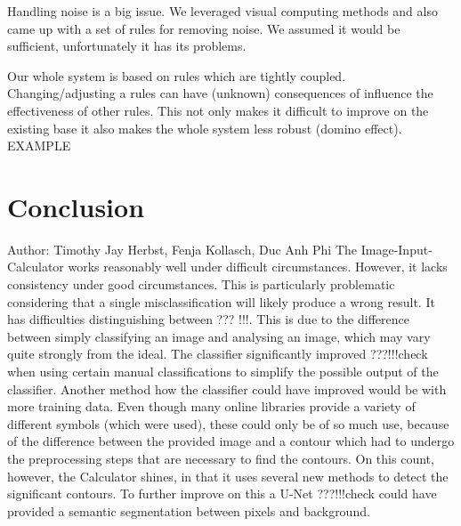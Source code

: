 \documentclass[12pt]{article}
\begin{document}
	Handling noise is a big issue. We leveraged visual computing methods and also came up with a set of rules for removing noise. We assumed it would be sufficient, unfortunately it has its problems.
	
	Our whole system is based on rules which are tightly coupled. Changing/adjusting a rules can have (unknown) consequences of influence the effectiveness of other rules. This not only makes it difficult to improve on the existing base it also makes the whole system less robust (domino effect). EXAMPLE
	
	
	\section{Conclusion}
		\small{Author: Timothy Jay Herbst, Fenja Kollasch, Duc Anh Phi} \newline \newline
	The Image-Input-Calculator works reasonably well under difficult circumstances.
	However, it lacks consistency under good circumstances.
	This is particularly problematic considering that a single misclassification will likely produce a wrong result.
	It has difficulties distinguishing between ??? !!!.
	This is due to the difference between simply classifying an image and analysing an image, which may vary quite strongly from the ideal.
	The classifier significantly improved ???!!!check when using certain manual classifications to simplify the possible output of the classifier.
	Another method how the classifier could have improved would be with more training data.
	Even though many online libraries provide a variety of different symbols (which were used), these could only be of so much use, because of the difference between the provided image and a contour which had to undergo the preprocessing steps that are necessary to find the contours.
	On this count, however, the Calculator shines, in that it uses several new methods to detect the significant contours.
	To further improve on this a U-Net ???!!!check could have provided a semantic segmentation between pixels and background.
	
	
	\pagebreak
\end{document}
